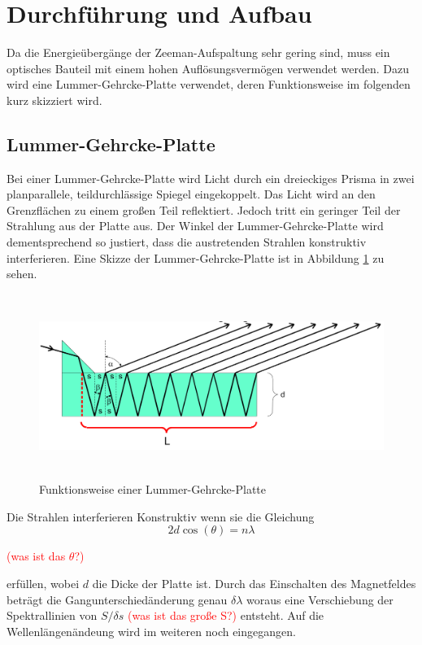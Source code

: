 \section{Durchführung und Aufbau}
\label{sec:Durchführung}
Da die Energieübergänge der Zeeman-Aufspaltung sehr gering sind, muss ein optisches Bauteil mit einem hohen Auflösungsvermögen verwendet werden. Dazu wird eine Lummer-Gehrcke-Platte verwendet, deren Funktionsweise im folgenden kurz skizziert wird.

\subsection{Lummer-Gehrcke-Platte}
Bei einer Lummer-Gehrcke-Platte wird Licht durch ein dreieckiges Prisma in zwei planparallele, teildurchlässige Spiegel eingekoppelt. Das Licht wird an den Grenzflächen zu einem großen Teil reflektiert. Jedoch tritt ein geringer Teil der Strahlung aus der Platte aus. Der Winkel der Lummer-Gehrcke-Platte wird dementsprechend so justiert, dass die austretenden Strahlen konstruktiv interferieren. Eine Skizze der Lummer-Gehrcke-Platte ist in Abbildung \ref{fig:Lum} zu sehen.

\begin{figure}[H]
  \centering
  \includegraphics[height=6cm]{Bilder/Lummer.png}
  \caption{Funktionsweise einer Lummer-Gehrcke-Platte \cite{V27}}
  \label{fig:Lum}
\end{figure}

Die Strahlen interferieren Konstruktiv wenn sie die Gleichung
\begin{equation}
  2 d \cos(\theta) = n \lambda
\end{equation}

\textcolor{red}{(was ist das $\theta$?)}

erfüllen, wobei $d$ die Dicke der Platte ist. Durch das Einschalten des Magnetfeldes beträgt die Gangunterschiedänderung genau $\delta \lambda$ woraus eine Verschiebung der Spektrallinien von $S/\delta s$ \textcolor{red}{(was ist das große S?)} entsteht. Auf die Wellenlängenändeung wird im weiteren noch eingegangen.

